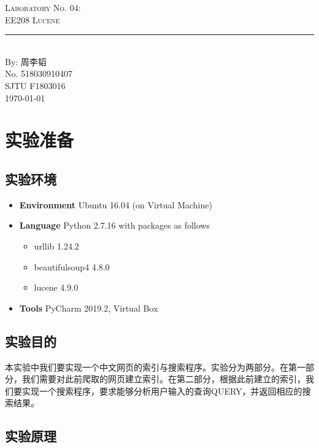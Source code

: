 \documentclass{article}
\newcommand{\labno}{04}
\newcommand{\labtitle}{EE208 Lucene}
\newcommand{\authorname}{周李韬}
\newcommand{\studentno}{518030910407}
\newcommand{\classno}{F1803016}
\begin{document}
\begin{center}
{\LARGE \textsc{Laboratory No. \labno:} \\ \vspace{4pt}}
{\Large \textsc{\labtitle} \\ \vspace{4pt}} 
\rule[13pt]{\textwidth}{1pt} \\ \vspace{15pt}
{\large By: \authorname \\ \vspace{10pt}
No. \studentno \\ \vspace{10pt}
SJTU \classno \\ \vspace{10pt}
\today \vspace{20pt}}
\end{center}



\section{实验准备}

\subsection{实验环境}
\begin{itemize}
\item\textbf{Environment} Ubuntu 16.04 (on Virtual Machine)
\item\textbf{Language} Python 2.7.16 with packages as follows
	\begin{itemize}
	\item urllib 1.24.2
	\item beautifulsoup4 4.8.0
	\item lucene 4.9.0
	\end{itemize}
\item\textbf{Tools} PyCharm 2019.2, Virtual Box
\end{itemize}

\subsection{实验目的}
本实验中我们要实现一个中文网页的索引与搜索程序。实验分为两部分。在第一部分，我们需要对此前爬取的网页建立索引。在第二部分，根据此前建立的索引，我们要实现一个搜索程序，要求能够分析用户输入的查询QUERY，并返回相应的搜索结果。

\subsection{实验原理}
\label{sec:principle}
\end{document}
